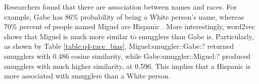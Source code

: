 \documentclass[12pt,article]{article}
\begin{document}
Researchers found that there are association between names and races. For example, Gabe has 86\% probability of being a White person's name, whereas 70\% percent of people named Miguel are Hispanic \cite{BiasInEmbedding}. More interestingly, word2vec shows that Miguel is much more similar to smugglers than Gabe is. Particularly, as shown by Table \ref{table:q4-race_bias}, Miguel:smuggler::Gabe:? returned smugglers with 0.486 cosine similarity, while Gabe:smuggler::Miguel:? produced smugglers with much higher similarity, at 0.596. This implies that a Hispanic is more associated with smugglers than a White person.

\begin{table}[H]
    \caption[justification=centering]{bias based on race in word2vec. The left table shows the most similar to Miguel:smuggler::Gabe:? and the right table shows the most similar words to Gabe:smuggler::Miguel:?}
    \label{table:q4-race_bias}
\hspace{90pt}
\begin{minipage}[c]{0.25\linewidth}%
\end{minipage}
\hspace{5pt}%
\begin{minipage}[c]{0.25\linewidth}%
\end{minipage}
\end{table}
\end{document}
